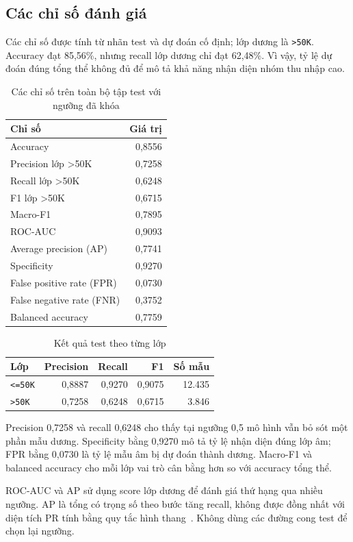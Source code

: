 \subsection{Các chỉ số đánh giá}
\label{subsec:6_5_1}
Các chỉ số được tính từ nhãn test và dự đoán cố định; lớp dương là \texttt{>50K}. Accuracy đạt 85,56\%, nhưng recall lớp dương chỉ đạt 62,48\%. Vì vậy, tỷ lệ dự đoán đúng tổng thể không đủ để mô tả khả năng nhận diện nhóm thu nhập cao.

\begin{table}[htbp]
\centering\small
\caption{Các chỉ số trên toàn bộ tập test với ngưỡng đã khóa}\label{tab:test-metrics}
\begin{tabular}{lr}
\toprule
Chỉ số & Giá trị \\
\midrule
Accuracy & 0,8556 \\
Precision lớp >50K & 0,7258 \\
Recall lớp >50K & 0,6248 \\
F1 lớp >50K & 0,6715 \\
Macro-F1 & 0,7895 \\
ROC-AUC & 0,9093 \\
Average precision (AP) & 0,7741 \\
Specificity & 0,9270 \\
False positive rate (FPR) & 0,0730 \\
False negative rate (FNR) & 0,3752 \\
Balanced accuracy & 0,7759 \\
\bottomrule
\end{tabular}
\end{table}
\begin{table}[htbp]
\centering\small
\caption{Kết quả test theo từng lớp}\label{tab:test-per-class}
\begin{tabular}{lrrrr}
\toprule
Lớp & Precision & Recall & F1 & Số mẫu \\
\midrule
\texttt{<=50K} & 0,8887 & 0,9270 & 0,9075 & 12.435 \\
\texttt{>50K} & 0,7258 & 0,6248 & 0,6715 & 3.846 \\
\bottomrule
\end{tabular}
\end{table}
Precision 0,7258 và recall 0,6248 cho thấy tại ngưỡng 0,5 mô hình vẫn bỏ sót một phần mẫu dương. Specificity bằng 0,9270 mô tả tỷ lệ nhận diện đúng lớp âm; FPR bằng 0,0730 là tỷ lệ mẫu âm bị dự đoán thành dương. Macro-F1 và balanced accuracy cho mỗi lớp vai trò cân bằng hơn so với accuracy tổng thể.

ROC-AUC và AP sử dụng score lớp dương để đánh giá thứ hạng qua nhiều ngưỡng. AP là tổng có trọng số theo bước tăng recall, không được đồng nhất với diện tích PR tính bằng quy tắc hình thang~\cite{sklearn-ap}. Không dùng các đường cong test để chọn lại ngưỡng.
